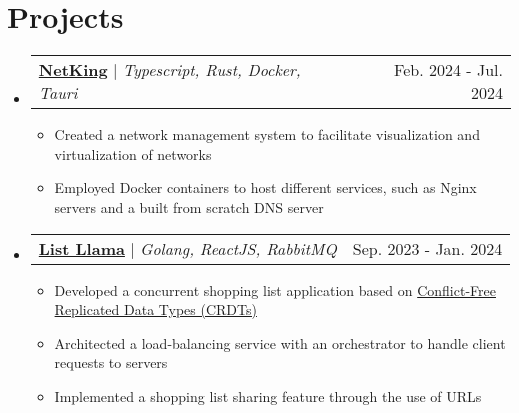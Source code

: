 \documentclass[a4paper,11pt]{article}
\makeatletter
\newcommand{\resumeItem}[1]{
  \item\small{
    {#1 \vspace{-2pt}}
  }
}
\newcommand{\resumeProjectHeading}[2]{
    \item
    \begin{tabular*}{0.97\textwidth}{l@{\extracolsep{\fill}}r}
      \small#1 & #2 \\
    \end{tabular*}\vspace{-7pt}
}
\newcommand{\resumeSubHeadingListStart}{\begin{itemize}[leftmargin=0.15in, label={}]}
\newcommand{\resumeSubHeadingListEnd}{\end{itemize}}
\newcommand{\resumeItemListStart}{\begin{itemize}}
\newcommand{\resumeItemListEnd}{\end{itemize}\vspace{-5pt}}
\makeatother
\begin{document}


\section{Projects}
\resumeSubHeadingListStart
      \resumeProjectHeading
          {\textbf{\href{https://github.com/matilde-silva-21/grs_project}{NetKing}} $|$ \emph{Typescript, Rust, Docker, Tauri}}{Feb. 2024 - Jul. 2024}
          \resumeItemListStart
            \resumeItem{Created a network management system to facilitate visualization and virtualization of networks}
            \resumeItem{Employed Docker containers to host different services, such as Nginx servers and a built from scratch DNS server}
          \resumeItemListEnd
      \resumeProjectHeading
          {\textbf{\href{https://github.com/matilde-silva-21/SDLE_project}{List Llama}} $|$ \emph{Golang, ReactJS, RabbitMQ}}{Sep. 2023 - Jan. 2024}
          \resumeItemListStart
            \resumeItem{Developed a concurrent shopping list application based on \href{https://crdt.tech/}{Conflict-Free Replicated Data Types (CRDTs)}}
            \resumeItem{Architected a load-balancing service with an orchestrator to handle client requests to servers}
            \resumeItem{Implemented a shopping list sharing feature through the use of URLs}
          \resumeItemListEnd
    \resumeSubHeadingListEnd
\leavevmode \\ %
\end{document}

